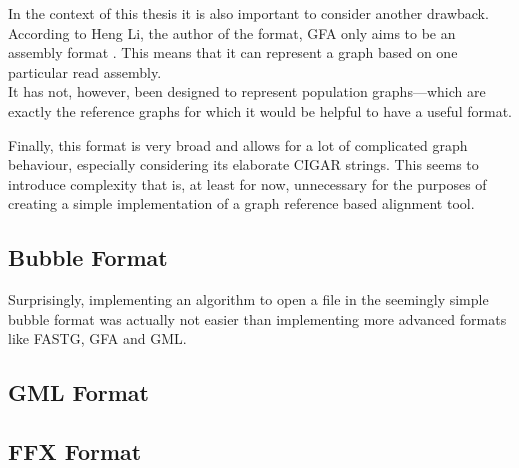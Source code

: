 \documentclass[a4paper,12pt,twoside,BCOR=10mm]{scrbook}
\begin{document}
In the context of this thesis it is also important to consider another drawback. 
According to Heng Li, the author of the format, GFA only aims to be an assembly format \citep{specGFA3}.
This means that it can represent a graph based on one particular read assembly. \\
It has not, however, been designed to represent population graphs---which are exactly 
the reference graphs for which it would be helpful to have a useful format.

Finally, this format is very broad and allows for a lot of complicated 
graph behaviour, especially considering its elaborate CIGAR strings. 
This seems to introduce complexity that is, at least for now, 
unnecessary for the purposes of creating a simple 
implementation of a graph reference based alignment tool.


\subsection{Bubble Format}

Surprisingly, implementing an algorithm to open a file in the seemingly simple bubble format was actually 
not easier than implementing more advanced formats like FASTG, GFA and GML.


\subsection{GML Format}


\subsection{FFX Format}

\end{document}
